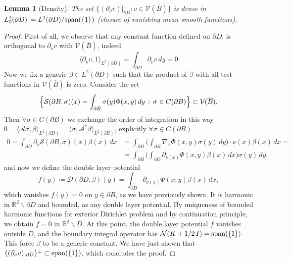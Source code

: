 \documentclass[10pt, a4paper, twoside, openright]{book}
\theoremstyle{definition}
\theoremstyle{plain}
\theoremstyle{plain}
\theoremstyle{plain}
\theoremstyle{plain}
\theoremstyle{plain}
\newtheorem{lemma}[subsection]{Lemma}
\theoremstyle{plain}
\theoremstyle{plain}
\theoremstyle{plain}
\begin{document}
\begin{lemma}[Density]
\label{lemma:density-V-1}
 The set $\{(\partial_\nu v )|_{\partial D}:v\in \mathcal{V}(\overline{B})\}$ is dense in $L^2_0(\partial D)\coloneqq L^2(\partial D)/\textup{span}(\{1\})$ (closure of vanishing mean smooth functions).
\end{lemma}
\begin{proof}
 First of all, we observe that any constant function defined on $\partial D$, is orthogonal 
 to $\partial_\nu v$ with $\mathcal{V}(\overline{B})$, indeed
 \begin{equation*}
  \langle \partial_\nu v, 1\rangle_{L^2(\partial D)} = \int_{\partial D}\partial_\nu v\,dy=0
 \end{equation*}
 Now we fix a generic $\beta\in L^2(\partial D)$ such that the product of $\beta$ with all test functions in $\mathcal{V}(\overline{B})$ is zero. 
 Consider the set
 \begin{equation}
  \Bigl\{\mathcal{S}(\partial B, \sigma)(x) = \int_{\partial B} \sigma(y)\Phi(x,y)\,dy\,:\, \sigma \in C(\partial B)\Bigr\} \subset \mathcal{V}(\overline{B}).
 \end{equation}
 Then $\forall\sigma\in C(\partial B)$ we exchange the order of integration in this way $0=\langle\mathcal{A}\sigma,\beta\rangle_{L^2(\partial D)} =\langle\sigma,\mathcal{A}^*\beta\rangle_{L^2(\partial B)}$, explicitly $\forall\sigma\in C(\partial B)$
 \begin{align*}
  0 = \int_{\partial D}\partial_\nu \mathcal{S}(\partial B, \sigma)(x) \beta(x) \, dx &= \int_{\partial D}\Big( \int_{\partial B}\nabla_x \Phi(x,y) \sigma(y)\,dy\Big)\cdot\nu(x)\beta(x) \, dx = \\
   &= \int_{\partial B}\Big( \int_{\partial D}\partial_{\nu(x)} \Phi(x,y) \beta(x)\,dx\Big)\sigma(y) \, dy,
 \end{align*}
 and now we define the double layer potential
 \begin{equation}
  f(y)\coloneqq \mathcal{D}(\partial D, \beta)(y)=\int_{\partial D}\partial_{\nu(x)} \Phi(x,y) \beta(x)\,dx,
 \end{equation}
 which vanishes $f(y)=0$ on $y\in\partial B$, as we have previously shown.
 It is harmonic in $\mathbb{R}^2\backslash\partial D$ and bounded, as any double layer potential. 
 By uniqueness of bounded harmonic functions for exterior Dirichlet problem and by continuation principle, we obtain $f=0$ in $\mathbb{R}^2\backslash\overline{D}$. At this point, the double layer potential $f$ vanishes outside $D$, and the boundary integral operator has $\mathcal{N}(K+1/2\,I)=\textup{span}(\{1\})$. This force $\beta$ to be a generic constant. 
 We have just shown that $\{(\partial_\nu v )|_{\partial D}\}^\perp \subset \textup{span}(\{1\})$, 
 which concludes the proof.
\end{proof}
\end{document}
